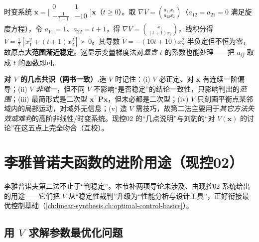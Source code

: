 \begin{example}[变量梯度法用于时变系统]\label{ex:vargrad-tv}
时变系统 $\dot{\mathbf{x}}=\big[\begin{smallmatrix}0&1\\-\frac{1}{t+1}&-10\end{smallmatrix}\big]\mathbf{x}$（$t\ge0$）。取 $\nabla V=\binom{a_{11}x_1}{a_{22}x_2}$（$a_{12}=a_{21}=0$ 满足旋度方程），令 $a_{11}=1$、$a_{22}=t+1$，得 $\nabla V=\binom{x_1}{(t+1)x_2}$，线积分得 $V=\tfrac12[x_1^2+(t+1)x_2^2]\succ0$。其导数 $\dot V=-(10t+10)x_2^2$ 半负定但不恒为零，故原点\textbf{大范围渐近稳定}。这显示变量梯度法对\emph{显含 $t$} 的系数也能处理——把 $a_{ij}$ 取成 $t$ 的函数即可。
\end{example}

\begin{note}
\textbf{对 $V$ 的几点共识（两书一致）.}\;造 $V$ 时记住：(i) $V$ 必正定、对 $\mathbf{x}$ 有连续一阶偏导；(ii) $V$ \emph{非唯一}，但不同 $V$ 不影响“是否稳定”的结论一致性，只影响判出的\emph{范围}；(iii) 最简形式是二次型 $\mathbf{x}^\top\mathbf{P}\mathbf{x}$，但未必都是二次型；(iv) $V$ 只刻画平衡点某邻域内的局部运动，对域外无信息；(v) 造 $V$ 需技巧，故第二法主要用于\emph{其它方法失效或难判}的高阶非线性/时变系统。现控02 的“几点说明”与刘豹的“对 $V(\mathbf{x})$ 的讨论”在这五点上完全吻合（互校）。
\end{note}

\section{李雅普诺夫函数的进阶用途（现控02）}
\label{sec:lyap-advanced-use}

李雅普诺夫第二法不止于“判稳定”。本节补两项导论未涉及、由现控02\cite{zhang2017modern} 系统给出的用途——它们把 $V$ 从“稳定性裁判”升级为“性能分析与设计工具”，正好衔接最优控制基础（\cref{ch:linear-synthesis,ch:optimal-control-basics}）。

\subsection{用 \texorpdfstring{$V$}{V} 求解参数最优化问题}
\label{sec:lyap-paramopt}

